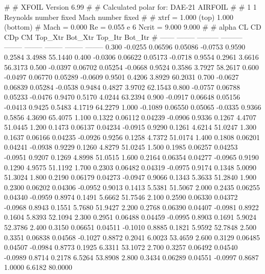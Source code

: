 #  
#       XFOIL         Version 6.99
#  
# Calculated polar for: DAE-21 AIRFOIL                                  
#  
# 1 1 Reynolds number fixed          Mach number fixed         
#  
# xtrf =   1.000 (top)        1.000 (bottom)  
# Mach =   0.000     Re =     0.055 e 6     Ncrit =   9.000  9.000
#  
#   alpha    CL        CD       CDp       CM     Top_Xtr  Bot_Xtr  Top_Itr  Bot_Itr
#  ------ -------- --------- --------- -------- -------- -------- -------- --------
   0.300  -0.0255   0.06596   0.05086  -0.0753   0.9590   0.2584   3.4988  55.1440
   0.400  -0.0306   0.06622   0.05173  -0.0718   0.9554   0.2961   3.6616  56.3173
   0.500  -0.0397   0.06702   0.05254  -0.0668   0.9524   0.3586   3.7927  58.2617
   0.600  -0.0497   0.06770   0.05289  -0.0609   0.9501   0.4206   3.8929  60.2031
   0.700  -0.0627   0.06839   0.05284  -0.0538   0.9484   0.4827   3.9702  62.1543
   0.800  -0.0757   0.06788   0.05233  -0.0476   0.9470   0.5170   4.0244  63.2394
   0.900  -0.0917   0.06648   0.05156  -0.0413   0.9425   0.5483   4.1719  64.2279
   1.000  -0.1089   0.06550   0.05065  -0.0335   0.9366   0.5856   4.3690  65.4075
   1.100   0.1322   0.06112   0.04239  -0.0906   0.9336   0.1267   4.4707  51.0445
   1.200   0.1473   0.06137   0.04234  -0.0915   0.9290   0.1261   4.6214  51.0247
   1.300   0.1637   0.06166   0.04235  -0.0926   0.9256   0.1258   4.7372  51.0174
   1.400   0.1808   0.06201   0.04241  -0.0938   0.9229   0.1260   4.8279  51.0245
   1.500   0.1985   0.06257   0.04253  -0.0951   0.9207   0.1269   4.8998  51.0515
   1.600   0.2164   0.06354   0.04277  -0.0965   0.9190   0.1290   4.9575  51.1192
   1.700   0.2303   0.06482   0.04319  -0.0975   0.9174   0.1348   5.0090  51.3024
   1.800   0.2190   0.06179   0.04273  -0.0947   0.9066   0.1343   5.3633  51.2840
   1.900   0.2300   0.06202   0.04306  -0.0952   0.9013   0.1413   5.5381  51.5067
   2.000   0.2435   0.06255   0.04340  -0.0959   0.8974   0.1491   5.6662  51.7546
   2.100   0.2590   0.06330   0.04372  -0.0968   0.8943   0.1551   5.7680  51.9427
   2.200   0.2768   0.06390   0.04407  -0.0981   0.8922   0.1604   5.8393  52.1094
   2.300   0.2951   0.06488   0.04459  -0.0995   0.8903   0.1691   5.9024  52.3786
   2.400   0.3150   0.06651   0.04511  -0.1010   0.8885   0.1821   5.9592  52.7848
   2.500   0.3351   0.06838   0.04568  -0.1027   0.8872   0.2041   6.0023  53.4659
   2.600   0.3129   0.06485   0.04507  -0.0984   0.8773   0.1925   6.3311  53.1072
   2.700   0.3257   0.06492   0.04540  -0.0989   0.8714   0.2178   6.5264  53.8908
   2.800   0.3434   0.06289   0.04551  -0.0997   0.8687   1.0000   6.6182  80.0000
